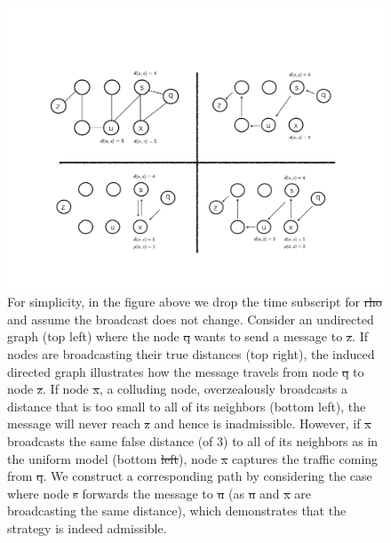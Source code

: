 \documentclass{comnet}
\providecommand{\DIFadd}[1]{{\protect\color{blue}\uwave{#1}}} %
\providecommand{\DIFdel}[1]{{\protect\color{red}\sout{#1}}}                      %
\providecommand{\DIFaddFL}[1]{\DIFadd{#1}} %
\providecommand{\DIFdelFL}[1]{\DIFdel{#1}} %
\providecommand{\DIFaddbeginFL}{} %
\providecommand{\DIFaddendFL}{} %
\providecommand{\DIFdelbeginFL}{} %
\providecommand{\DIFdelendFL}{} %
\begin{document}
\begin{figure}
\centering
\includegraphics[width=\textwidth]{images/bgppanel2.pdf}
\caption{For simplicity, in the figure above we drop the time subscript for
\DIFdelbeginFL \DIFdelFL{rho }\DIFdelendFL \DIFaddbeginFL \DIFaddFL{$\rho$ }\DIFaddendFL and assume the broadcast does not change. Consider an undirected graph
(top left) where the node \DIFdelbeginFL \DIFdelFL{q }\DIFdelendFL \DIFaddbeginFL \DIFaddFL{$q$ }\DIFaddendFL wants to send a message to \DIFdelbeginFL \DIFdelFL{z}\DIFdelendFL \DIFaddbeginFL \DIFaddFL{$z$}\DIFaddendFL .  If nodes are
broadcasting their true distances (top right), the induced directed graph
illustrates how the message travels from node \DIFdelbeginFL \DIFdelFL{q }\DIFdelendFL \DIFaddbeginFL \DIFaddFL{$q$ }\DIFaddendFL to node \DIFdelbeginFL \DIFdelFL{z}\DIFdelendFL \DIFaddbeginFL \DIFaddFL{$z$}\DIFaddendFL .  If node \DIFdelbeginFL \DIFdelFL{x}\DIFdelendFL \DIFaddbeginFL \DIFaddFL{$x$}\DIFaddendFL , a
colluding node, overzealously broadcasts a distance that is too small to all of
its neighbors (bottom left), the message will never reach \DIFdelbeginFL \DIFdelFL{z }\DIFdelendFL \DIFaddbeginFL \DIFaddFL{$z$ }\DIFaddendFL and hence is
inadmissible.  However, if \DIFdelbeginFL \DIFdelFL{x }\DIFdelendFL \DIFaddbeginFL \DIFaddFL{$x$ }\DIFaddendFL broadcasts the same false distance (of 3) to all
of its neighbors as in the uniform model (bottom \DIFdelbeginFL \DIFdelFL{left}\DIFdelendFL \DIFaddbeginFL \DIFaddFL{right}\DIFaddendFL ), node \DIFdelbeginFL \DIFdelFL{x }\DIFdelendFL \DIFaddbeginFL \DIFaddFL{$x$ }\DIFaddendFL captures the
traffic coming from \DIFdelbeginFL \DIFdelFL{q}\DIFdelendFL \DIFaddbeginFL \DIFaddFL{$q$}\DIFaddendFL .  We construct a corresponding path by considering the
case where node \DIFdelbeginFL \DIFdelFL{s }\DIFdelendFL \DIFaddbeginFL \DIFaddFL{$s$ }\DIFaddendFL forwards the message to \DIFdelbeginFL \DIFdelFL{u }\DIFdelendFL \DIFaddbeginFL \DIFaddFL{$u$ }\DIFaddendFL (as \DIFdelbeginFL \DIFdelFL{u }\DIFdelendFL \DIFaddbeginFL \DIFaddFL{$u$ }\DIFaddendFL and \DIFdelbeginFL \DIFdelFL{x }\DIFdelendFL \DIFaddbeginFL \DIFaddFL{$x$ }\DIFaddendFL are
broadcasting the same distance), which demonstrates that the strategy is indeed
admissible.}
\label{fig:admissibility}
\end{figure}
\end{document}

